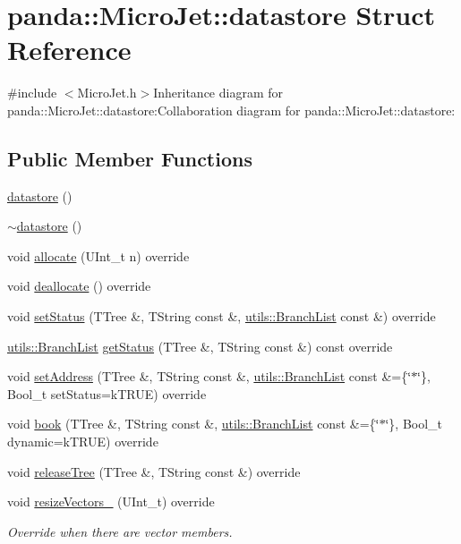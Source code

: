 \hypertarget{structpanda_1_1MicroJet_1_1datastore}{
\section{panda::MicroJet::datastore Struct Reference}
\label{structpanda_1_1MicroJet_1_1datastore}
}


{\ttfamily \#include $<$MicroJet.h$>$}Inheritance diagram for panda::MicroJet::datastore:Collaboration diagram for panda::MicroJet::datastore:\subsection*{Public Member Functions}
\begin{DoxyCompactItemize}
\item 
\hyperlink{structpanda_1_1MicroJet_1_1datastore_adac05a4e9f5487a0932162ad3781f8aa}{datastore} ()
\item 
\hyperlink{structpanda_1_1MicroJet_1_1datastore_a35979d6037e5229b018a32e3d0700360}{$\sim$datastore} ()
\item 
void \hyperlink{structpanda_1_1MicroJet_1_1datastore_a09aae2ebbbda55c6616b6a693f43bb66}{allocate} (UInt\_\-t n) override
\item 
void \hyperlink{structpanda_1_1MicroJet_1_1datastore_a03473e3dcba5abe73c123ce2c1d3292c}{deallocate} () override
\item 
void \hyperlink{structpanda_1_1MicroJet_1_1datastore_a5dad86e6e7ed7f7ee5ffb793bb81cbbe}{setStatus} (TTree \&, TString const \&, \hyperlink{classpanda_1_1utils_1_1BranchList}{utils::BranchList} const \&) override
\item 
\hyperlink{classpanda_1_1utils_1_1BranchList}{utils::BranchList} \hyperlink{structpanda_1_1MicroJet_1_1datastore_ae893cdc52ad9ae8ffc8a8cea1cac1377}{getStatus} (TTree \&, TString const \&) const override
\item 
void \hyperlink{structpanda_1_1MicroJet_1_1datastore_a475b19becb4a39eb0248e8b9c785feb3}{setAddress} (TTree \&, TString const \&, \hyperlink{classpanda_1_1utils_1_1BranchList}{utils::BranchList} const \&=\{\char`\"{}$\ast$\char`\"{}\}, Bool\_\-t setStatus=kTRUE) override
\item 
void \hyperlink{structpanda_1_1MicroJet_1_1datastore_a1a17e11396756ae30ac63c834cbe5976}{book} (TTree \&, TString const \&, \hyperlink{classpanda_1_1utils_1_1BranchList}{utils::BranchList} const \&=\{\char`\"{}$\ast$\char`\"{}\}, Bool\_\-t dynamic=kTRUE) override
\item 
void \hyperlink{structpanda_1_1MicroJet_1_1datastore_a9722ed3783e57fb5e55307d72ebddb15}{releaseTree} (TTree \&, TString const \&) override
\item 
void \hyperlink{structpanda_1_1MicroJet_1_1datastore_a9570f85bfad7f55e239670d0f364cb8b}{resizeVectors\_\-} (UInt\_\-t) override
\begin{DoxyCompactList}\small\item\em Override when there are vector members. \item\end{DoxyCompactList}\end{DoxyCompactItemize}


